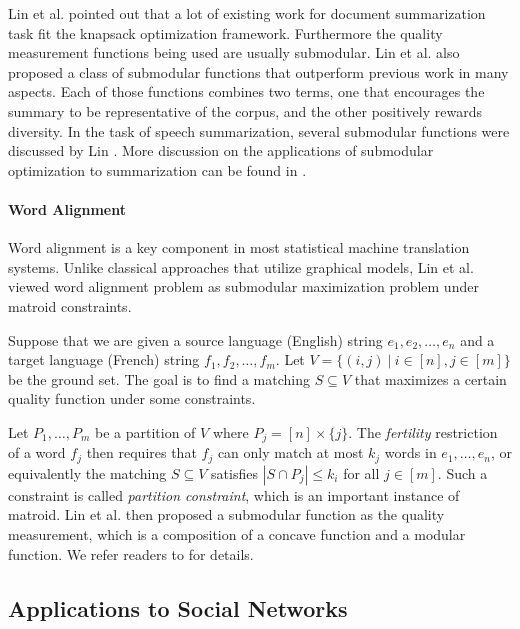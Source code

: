 Lin et al. \cite{LB11} pointed out that a lot of existing work for document summarization task fit the knapsack optimization framework. Furthermore the quality measurement functions being used are usually submodular. Lin et al. also proposed a class of submodular functions that outperform previous work in many aspects. Each of those functions combines two terms, one that encourages the summary to be representative of the corpus, and the other positively rewards diversity. In the task of speech summarization, several submodular functions were discussed by Lin \cite{L12}. More discussion on the applications of submodular optimization to summarization can be found in \cite{L12}.

\paragraph{Word Alignment}
Word alignment is a key component in most statistical machine translation systems. Unlike classical approaches that utilize graphical models, Lin et al. \cite{LB11word} viewed word alignment problem as submodular maximization problem under matroid constraints. 

Suppose that we are given a source language (English) string $e_1, e_2, \ldots, e_n$ and a target language (French) string $f_1, f_2, \ldots, f_m$. Let $V = \{(i, j) ~|~ i\in[n], j\in[m] \}$ be the ground set. The goal is to find a matching $S\subseteq V$ that maximizes a certain quality function under some constraints. 

Let $P_1, \ldots, P_m$ be a partition of $V$ where $P_j = [n]\times \{j\}$. The \emph{fertility} restriction of a word $f_j$ then requires that $f_j$ can only match at most $k_j$ words in $e_1,\ldots, e_n$, or equivalently the matching $S \subseteq V$ satisfies $|S \cap P_j| \leq k_i$ for all $j\in[m]$. Such a constraint is called \emph{partition constraint}, which is an important instance of matroid. Lin et al. then proposed a submodular function as the quality measurement, which is a composition of a concave function and a modular function. We refer readers to \cite{LB11word} for details.





\subsection{Applications to Social Networks}
